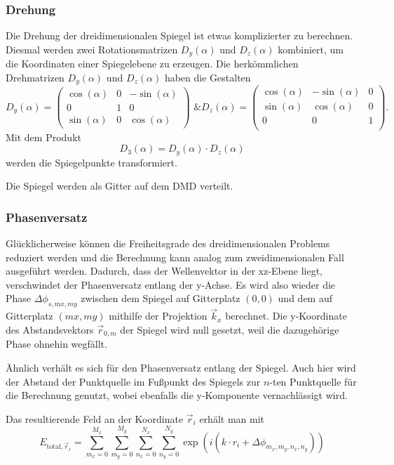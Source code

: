 \subsubsection{Drehung}
Die Drehung der dreidimensionalen Spiegel ist etwas komplizierter zu berechnen. Diesmal werden zwei Rotationsmatrizen $D_y(\alpha)$ und $D_z(\alpha)$ kombiniert, um die Koordinaten einer Spiegelebene zu erzeugen. Die herkömmlichen Drehmatrizen $D_y(\alpha)$ und $D_z(\alpha)$ haben die Gestalten
\begin{equation}
    D_y(\alpha)=\left(\begin{matrix}
        \cos(\alpha) & 0 & -\sin(\alpha) \\
        0 & 1 & 0 \\ 
        \sin(\alpha) & 0 & \cos(\alpha)
    \end{matrix}\right)\text{ \& }
    D_z(\alpha)=\left(\begin{matrix}
        \cos(\alpha) & -\sin(\alpha) & 0 \\
        \sin(\alpha) & \cos(\alpha) & 0 \\
        0 & 0 & 1 \\ 
    \end{matrix}\right).
\end{equation}
Mit dem Produkt
\begin{equation}
    D_3(\alpha)=D_y(\alpha)\cdot D_z(\alpha)
\end{equation}
werden die Spiegelpunkte transformiert.

Die Spiegel werden als Gitter auf dem DMD verteilt.
\subsubsection{Phasenversatz}
Glücklicherweise können die Freiheitsgrade des dreidimensionalen Problems reduziert werden und die Berechnung kann analog zum zweidimensionalen Fall ausgeführt werden. Dadurch, dass der Wellenvektor in der xz-Ebene liegt, verschwindet der Phasenversatz entlang der y-Achse. Es wird also wieder die Phase $\Delta\phi_{s, mx, my}$ zwischen dem Spiegel auf Gitterplatz $(0, 0)$ und dem auf Gitterplatz $(mx, my)$ mithilfe der Projektion $\vec{k}_x$ berechnet. Die y-Koordinate des Abstandsvektors $\vec{r}_{0, m}$ der Spiegel wird null gesetzt, weil die dazugehörige Phase ohnehin wegfällt.

Ähnlich verhält es sich für den Phasenversatz entlang der Spiegel. Auch hier wird der Abstand der Punktquelle im Fußpunkt des Spiegels zur $n$-ten Punktquelle für die Berechnung genutzt, wobei ebenfalls die y-Komponente vernachlässigt wird.

Das resultierende Feld an der Koordinate $\vec{r}_i$ erhält man mit
\begin{equation}
    E_{\text{total}, \vec{r}_i}=\sum_{m_x=0}^{M_x}\sum_{m_y=0}^{M_y}\sum_{n_x=0}^{N_x}\sum_{n_y=0}^{N_y}\exp(i(k\cdot r_i+\Delta\phi_{m_x, m_y, n_x, n_y}))
\end{equation}